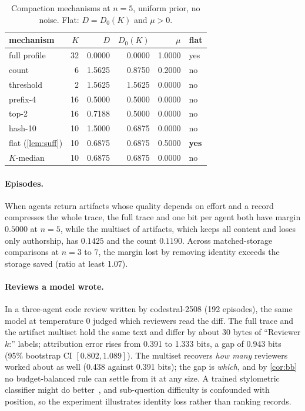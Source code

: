 \documentclass[sigconf,anonymous,acmthm=false]{acmart}
\theoremstyle{acmplain}
\theoremstyle{acmdefinition}
\begin{document}
\begin{table}[t]
\caption{Compaction mechanisms at $n=5$, uniform prior, no noise. Flat: $D=D_0(K)$ and $\mu>0$.}
\label{tab:mech}
\footnotesize
\begin{tabular}{@{}lrrrrl@{}}
\toprule
mechanism & $K$ & $D$ & $D_0(K)$ & $\mu$ & flat\\
\midrule
full profile & 32 & 0.0000 & 0.0000 & 1.0000 & yes\\
count & 6 & 1.5625 & 0.8750 & 0.2000 & no\\
threshold & 2 & 1.5625 & 1.5625 & 0.0000 & no\\
prefix-4 & 16 & 0.5000 & 0.5000 & 0.0000 & no\\
top-2 & 16 & 0.7188 & 0.5000 & 0.0000 & no\\
hash-10 & 10 & 1.5000 & 0.6875 & 0.0000 & no\\
\midrule
flat (\cref{lem:suff}) & 10 & 0.6875 & 0.6875 & 0.5000 & \textbf{yes}\\
$K$-median & 10 & 0.6875 & 0.6875 & 0.0000 & no\\
\bottomrule
\end{tabular}
\end{table}

\paragraph{Episodes.} When agents return artifacts whose quality depends on effort and a record
compresses the whole trace, the full trace and one bit per agent both have margin $0.5000$ at
$n=5$, while the multiset of artifacts, which keeps all content and loses only authorship,
has $0.1425$ and the count $0.1190$. Across matched-storage comparisons at $n=3$ to 7, the
margin lost by removing identity exceeds the storage saved (ratio at least 1.07).

\paragraph{Reviews a model wrote.} In a three-agent code review written by codestral-2508 (192
episodes), the same model at temperature 0 judged which reviewers read the diff. The full
trace and the artifact multiset hold the same text and differ by about 30 bytes of
``Reviewer $k$:'' labels; attribution error rises from 0.391 to 1.333 bits, a gap of 0.943 bits
(95\% bootstrap CI $[0.802,1.089]$). The multiset recovers \emph{how many} reviewers worked
about as well (0.438 against 0.391 bits); the gap is \emph{which}, and by \cref{cor:bb} no
budget-balanced rule can settle from it at any size. A trained stylometric
classifier might do better~\cite{dietrich2026peers}, and sub-question difficulty is confounded
with position, so the experiment illustrates identity loss rather than ranking records.
\end{document}
